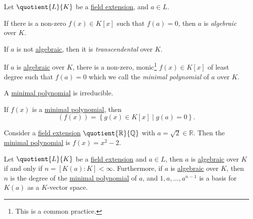 \begin{definition*}
	Let \(\quotient{L}{K} \) be a \hyperref[def:field-extension]{field extension}, and \(a\in L\).
	\begin{definition}[Algebraic]\label{def:algebraic}
		If there is a non-zero \(f(x)\in K[x]\) such that \(f(a) = 0\), then \(a\) is \emph{algebraic} over \(K\).
	\end{definition}

	\begin{definition}[Transcendental]\label{def:transcendental}
		If \(a\) is not \hyperref[def:algebraic]{algebraic}, then it is \emph{transcendental} over \(K\).
	\end{definition}
\end{definition*}

\begin{definition}\label{def:minimal-polynomial}
	If \(a\) is \hyperref[def:algebraic]{algebraic} over \(K\), there is a non-zero, monic\footnote{This is a common practice.} \(f(x)\in K[x]\) of least degree such that \(f(a) = 0\) which we call the \emph{minimal polynomial} of \(a\) over \(K\).
\end{definition}

\begin{remark}
	A \hyperref[def:minimal-polynomial]{minimal polynomial} is irreducible.
\end{remark}

\begin{remark}
	If \(f(x)\) is a \hyperref[def:minimal-polynomial]{minimal polynomial}, then
	\[
		(f(x)) = \left\{ g(x)\in K[x] \mid g(a) = 0 \right\}.
	\]
\end{remark}
\begin{eg}
	Consider a \hyperref[def:field-extension]{field extension} \(\quotient{\mathbb{R} }{\mathbb{Q} } \) with \(a = \sqrt{2} \in \mathbb{R} \). Then the \hyperref[def:minimal-polynomial]{minimal polynomial} is \(f(x) = x^2 - 2\).
\end{eg}

\begin{theorem}\label{thm:lec11-2}
	Let \(\quotient{L}{K} \) be a \hyperref[def:field-extension]{field extension} and \(a\in L\), then \(a\) is \hyperref[def:algebraic]{algebraic} over \(K\) if and only if \(n = [K(a) \colon K] < \infty \). Furthermore, if \(a\) is \hyperref[def:algebraic]{algebraic} over \(K\), then \(n\) is the degree of the \hyperref[def:minimal-polynomial]{minimal polynomial} of \(a\), and \(1, a, \ldots , a^{n-1}\) is a basis for \(K(a)\) as a \(K\)-vector space.
\end{theorem}

